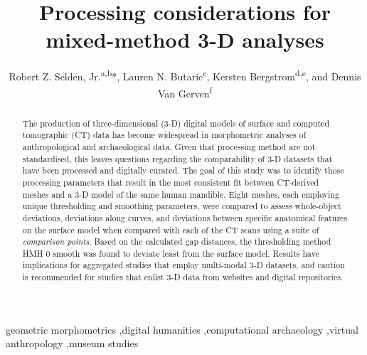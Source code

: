 \documentclass[review]{elsarticle}
\begin{document}
\begin{frontmatter}

\title{Processing considerations for mixed-method 3-D analyses}


\author{Robert Z. Selden, Jr.\textsuperscript{a,b}*, Lauren N. Butaric\textsuperscript{c}, Kersten Bergstrom\textsuperscript{d,e}, and Dennis Van Gerven\textsuperscript{f}}
\address[1]{Heritage Research Center, Stephen F. Austin State University, USA}
\address[2]{Cultural Heritage Department, Jean Monnet University, FR}
\address[3]{Department of Anatomy, Des Moines University, USA}
\address[4]{Department of Anthropology, Texas A\&M University, USA}
\address[5]{School of Biological Sciences, Washington State University-Tri-Cities, USA}
\address[6]{Department of Anthropology, University of Colorado Boulder, USA}

\begin{abstract}
The production of three-dimensional (3-D) digital models of surface and computed tomographic (CT) data has become widespread in morphometric analyses of anthropological and archaeological data. Given that processing method are not standardised, this leaves questions regarding the comparability of 3-D datasets that have been processed and digitally curated. The goal of this study was to identify those processing parameters that result in the most consistent fit between CT-derived meshes and a 3-D model of the same human mandible. Eight meshes, each employing unique thresholding and smoothing parameters, were compared to assess whole-object deviations, deviations along curves, and deviations between specific anatomical features on the surface model when compared with each of the CT scans using a suite of \textit{comparison points}. Based on the calculated gap distances, the thresholding method HMH 0 smooth was found to deviate least from the surface model. Results have implications for aggregated studies that employ multi-modal 3-D datasets, and caution is recommended for studies that enlist 3-D data from websites and digital repositories.
\end{abstract}

\begin{keyword}
geometric morphometrics \sep digital humanities \sep computational archaeology \sep virtual anthropology \sep museum studies
\end{keyword}

\end{frontmatter}
\end{document}
